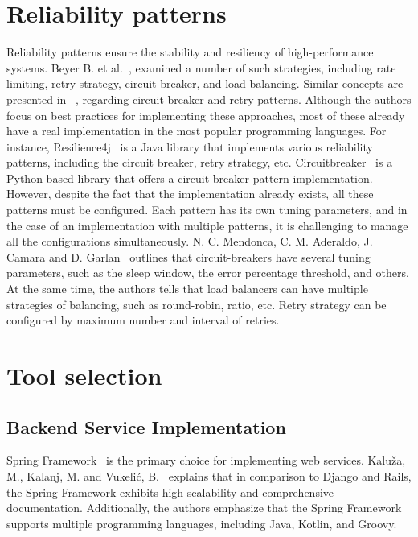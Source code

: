 \section{Reliability patterns}\label{sec:reliability}
Reliability patterns ensure the stability and resiliency of high-performance systems.
Beyer B. et al.~\cite{google_sre}, examined a number of such strategies, including rate limiting, retry strategy, circuit breaker, and load balancing. Similar concepts are presented in ~\cite{reliability_patterns}, regarding circuit-breaker and retry patterns. Although the authors focus on best practices for implementing these approaches, most of these already have a real implementation in the most popular programming languages. For instance, Resilience4j~\cite{resilience4j} is a Java library that implements various reliability patterns, including the circuit breaker, retry strategy, etc. Circuitbreaker~\cite{circuitbreaker} is a Python-based library that offers a circuit breaker pattern implementation. However, despite the fact that the implementation already exists, all these patterns must be configured. Each pattern has its own tuning parameters, and in the case of an implementation with multiple patterns, it is challenging to manage all the configurations simultaneously. N. C. Mendonca, C. M. Aderaldo, J. Camara and D. Garlan~\cite{circuit_breaker} outlines that circuit-breakers have several tuning parameters, such as the sleep window, the error percentage threshold, and others.
At the same time, the authors tells that load balancers can have multiple strategies of balancing, such as round-robin, ratio, etc. Retry strategy can be configured by maximum number and interval of retries.

\section{Tool selection}\label{sec:tool-selection}
\subsection{Backend Service Implementation}
Spring Framework~\cite{spring} is the primary choice for implementing web services.
Kaluža, M., Kalanj, M. and Vukelić, B.~\cite{frameworks} explains that in comparison to Django and Rails, the Spring Framework exhibits high scalability and comprehensive documentation.
Additionally, the authors emphasize that the Spring Framework supports multiple programming languages, including Java, Kotlin, and Groovy.

